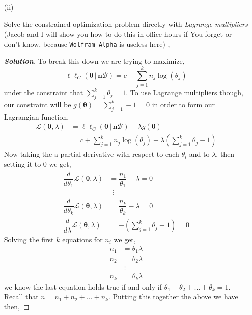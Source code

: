 \documentclass[12pt]{article}
\newcommand{\given}{\, | \,}
\newenvironment{solution}{\begin{tcolorbox}[breakable]\begin{proof}[\textbf{\textit{Solution}}] }{\end{proof}\end{tcolorbox}}
\begin{document}
\begin{itemize}
\begin{itemize}
\begin{itemize}

\item[(ii)]

Solve the constrained optimization problem directly with \textit{Lagrange multipliers} (Jacob and I will show you how to do this in office hours if You forget or don't know, because \texttt{Wolfram Alpha} is useless here) \fbox{\textbf{\textit{[5 points]}}}, \vspace*{0.025in}

\begin{solution}
    To break this down we are trying to maximize,
    \[\ell\ell_C(\bm{\theta} \given \bm{n}\mathcal{B}) = c + \sum_{j =1}^{k}n_j\log(\theta_j)\] 
    under the constraint that $\sum_{j = 1}^{k}\theta_j = 1$. To use Lagrange multipliers though, our constraint will be $g(\bm{\theta}) = \sum_{j = 1}^{k} -1 = 0$ in order to form our Lagrangian function,
    \begin{align*}
        \mathcal{L}(\bm{\theta}, \lambda) &= \ell\ell_C(\bm{\theta} \given \bm{n}\mathcal{B}) - \lambda g(\bm{\theta}) \\
        &= c + \sum_{j = 1}^{k}n_j\log(\theta_j) - \lambda(\sum_{j = 1}^{k}\theta_j - 1)
    \end{align*}
    Now taking the a partial derivative with respect to each $\theta_i$ and to $\lambda$, then setting it to 0 we get,
    \begin{align*}
        \dfrac{d}{d\theta_1}\mathcal{L}(\bm{\theta}, \lambda) &= \dfrac{n_1}{\theta_1} - \lambda = 0 \\
        &\  \ \vdots \\
        \dfrac{d}{d\theta_k} \mathcal{L}(\bm{\theta}, \lambda) &= \dfrac{n_k}{\theta_k} - \lambda = 0 \\
        \dfrac{d}{d\lambda} \mathcal{L}(\bm{\theta}, \lambda) &= -(\sum_{j = 1}^{k}\theta_j - 1) = 0
    \end{align*}
    Solving the first $k$ equations for $n_i$ we get,
    \begin{align*}
        n_1 &= \theta_1 \lambda \\
        n_2 &= \theta_2 \lambda \\
            & \ \vdots \\
        n_k &= \theta_k \lambda 
    \end{align*}
    we know the last equation holds true if and only if  $\theta_1 + \theta_2 + \dots + \theta_k = 1$. Recall that $n = n_1 + n_2 + \dots + n_k$. Putting this together the above we have then,

\end{solution}
\end{itemize}
\end{itemize}
\end{itemize}
\end{document}
